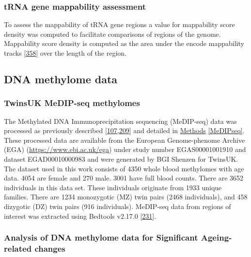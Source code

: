 \documentclass[
]{book}
\begin{document}
\hypertarget{mappabilityDensity}{%
\subsubsection{tRNA gene mappability assessment}\label{mappabilityDensity}}

To assess the mappability of tRNA gene regions a value for mappability score density was computed to facilitate comparisons of regions of the genome.
Mappability score density is computed as the area under the encode mappability tracks {[}\protect\hyperlink{ref-Derrien2012}{358}{]} over the length of the region.

\hypertarget{tRNA-DNA-methylome-Data}{%
\subsection{DNA methylome data}\label{tRNA-DNA-methylome-Data}}

\hypertarget{EpiTwinsMethods}{%
\subsubsection{TwinsUK MeDIP-seq methylomes}\label{EpiTwinsMethods}}

The Methylated DNA Immunoprecipitation sequencing (MeDIP-seq) data was processed as previously described {[}\protect\hyperlink{ref-Bell2017a}{107},\protect\hyperlink{ref-Bell2016}{209}{]} and detailed in \protect\hyperlink{MeDIPseq}{Methods} \ref{MeDIPseq}.
These processed data are available from the European Genome-phenome Archive (EGA) (\url{https://www.ebi.ac.uk/ega}) under study number EGAS00001001910 and dataset EGAD00010000983 and were generated by BGI Shenzen for TwinsUK.
The dataset used in this work consists of 4350 whole blood methylomes with age data.
4054 are female and 270 male.
3001 have full blood counts.
There are 3652 individuals in this data set.
These individuals originate from 1933 unique families.
There are 1234 monozygotic (MZ) twin pairs (2468 individuals), and 458 dizygotic (DZ) twin pairs (916 individuals).
MeDIP-seq data from regions of interest was extracted using Bedtools v2.17.0 {[}\protect\hyperlink{ref-Quinlan2010}{231}{]}.

\hypertarget{medipmodels}{%
\subsubsection{Analysis of DNA methylome data for Significant Ageing-related changes}\label{medipmodels}}
\end{document}
